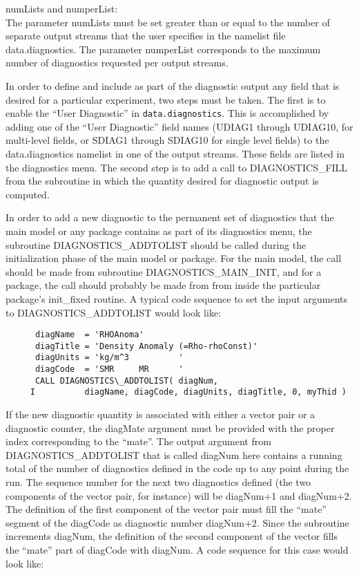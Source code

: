 \noindent numLists and numperList: \\
\noindent The parameter numLists must be set greater than or equal to
the number of separate output streams that the user specifies in the
namelist file data.diagnostics.  The parameter numperList corresponds
to the maximum number of diagnostics requested per output streams.

\noindent
In order to define and include as part of the diagnostic output any
field that is desired for a particular experiment, two steps must be
taken. The first is to enable the ``User Diagnostic'' in
{\tt data.diagnostics}. This is accomplished by adding one of the ``User
Diagnostic'' field names (UDIAG1 through UDIAG10, for multi-level
fields, or SDIAG1 through SDIAG10 for single level fields) to the
data.diagnostics namelist in one of the output streams. These fields
are listed in the diagnostics menu. The second step is to add a call
to DIAGNOSTICS\_FILL from the subroutine in which the quantity desired
for diagnostic output is computed.

\noindent
In order to add a new diagnostic to the permanent set of diagnostics
that the main model or any package contains as part of its diagnostics
menu, the subroutine DIAGNOSTICS\_ADDTOLIST should be called during the
initialization phase of the main model or package. For the main model,
the call should be made from subroutine DIAGNOSTICS\_MAIN\_INIT, and
for a package, the call should probably be made from 
from inside the particular package's init\_fixed routine. 
A typical code sequence to set the
input arguments to DIAGNOSTICS\_ADDTOLIST would look like:

\begin{verbatim}
      diagName  = 'RHOAnoma'
      diagTitle = 'Density Anomaly (=Rho-rhoConst)'
      diagUnits = 'kg/m^3          '
      diagCode  = 'SMR     MR      '
      CALL DIAGNOSTICS\_ADDTOLIST( diagNum,
     I          diagName, diagCode, diagUnits, diagTitle, 0, myThid )
\end{verbatim}

\noindent If the new diagnostic quantity is associated with either a
vector pair or a diagnostic counter, the diagMate argument must be
provided with the proper index corresponding to the ``mate''. 
The output argument from DIAGNOSTICS\_ADDTOLIST that is called diagNum here 
contains a running total of the number of diagnostics defined in the code up to
any point during the run. The sequence number for the next two
diagnostics defined (the two components of the vector pair, for
instance) will be diagNum+1 and diagNum+2. The definition of the first
component of the vector pair must fill the ``mate'' segment of the
diagCode as diagnostic number diagNum+2.  Since the subroutine
increments diagNum, the definition of the second component of the
vector fills the ``mate'' part of diagCode with diagNum. A code
sequence for this case would look like:

